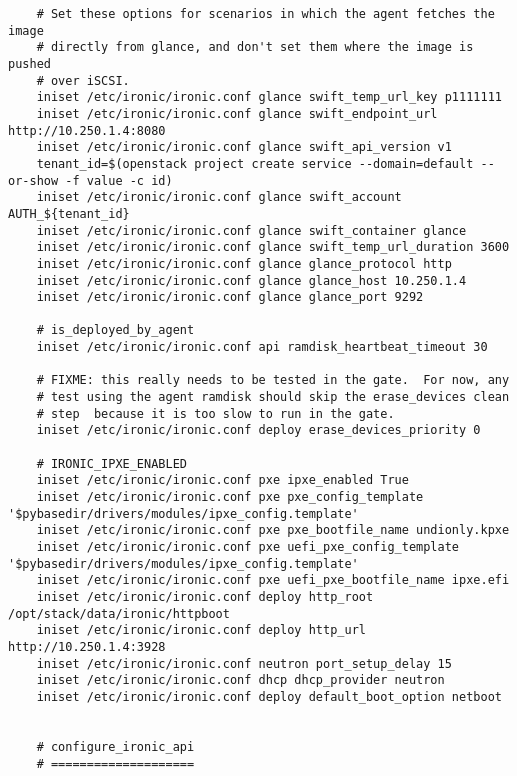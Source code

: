 \documentclass[a4paper,left=1.5cm,right=1.5cm,11pt]{article}
\begin{document}
\begin{lstlisting}
	# Set these options for scenarios in which the agent fetches the image
    # directly from glance, and don't set them where the image is pushed
    # over iSCSI.
	iniset /etc/ironic/ironic.conf glance swift_temp_url_key p1111111
    iniset /etc/ironic/ironic.conf glance swift_endpoint_url http://10.250.1.4:8080
    iniset /etc/ironic/ironic.conf glance swift_api_version v1
	tenant_id=$(openstack project create service --domain=default --or-show -f value -c id)
	iniset /etc/ironic/ironic.conf glance swift_account AUTH_${tenant_id}
    iniset /etc/ironic/ironic.conf glance swift_container glance
    iniset /etc/ironic/ironic.conf glance swift_temp_url_duration 3600
    iniset /etc/ironic/ironic.conf glance glance_protocol http
    iniset /etc/ironic/ironic.conf glance glance_host 10.250.1.4
    iniset /etc/ironic/ironic.conf glance glance_port 9292

	# is_deployed_by_agent
	iniset /etc/ironic/ironic.conf api ramdisk_heartbeat_timeout 30

	# FIXME: this really needs to be tested in the gate.  For now, any
    # test using the agent ramdisk should skip the erase_devices clean
    # step  because it is too slow to run in the gate.
	iniset /etc/ironic/ironic.conf deploy erase_devices_priority 0

	# IRONIC_IPXE_ENABLED
	iniset /etc/ironic/ironic.conf pxe ipxe_enabled True
    iniset /etc/ironic/ironic.conf pxe pxe_config_template '$pybasedir/drivers/modules/ipxe_config.template'
    iniset /etc/ironic/ironic.conf pxe pxe_bootfile_name undionly.kpxe
    iniset /etc/ironic/ironic.conf pxe uefi_pxe_config_template '$pybasedir/drivers/modules/ipxe_config.template'
    iniset /etc/ironic/ironic.conf pxe uefi_pxe_bootfile_name ipxe.efi
    iniset /etc/ironic/ironic.conf deploy http_root /opt/stack/data/ironic/httpboot
    iniset /etc/ironic/ironic.conf deploy http_url http://10.250.1.4:3928
	iniset /etc/ironic/ironic.conf neutron port_setup_delay 15
	iniset /etc/ironic/ironic.conf dhcp dhcp_provider neutron
    iniset /etc/ironic/ironic.conf deploy default_boot_option netboot


	# configure_ironic_api
	# ====================


\end{lstlisting}
\end{document}
